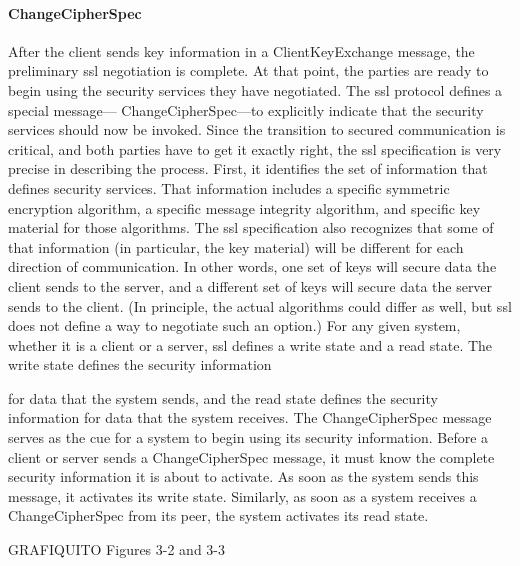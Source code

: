 \paragraph{ChangeCipherSpec}
After the client sends key information in a ClientKeyExchange message, 
the preliminary ssl negotiation is complete. At that point, the
parties are ready to begin using the security services they have negotiated.
 The ssl protocol defines a special message—
ChangeCipherSpec—to explicitly indicate that the security services
should now be invoked.
Since the transition to secured communication is critical, and both
parties have to get it exactly right, the ssl specification is very precise
in describing the process. First, it identifies the set of information
that defines security services. That information includes a specific
symmetric encryption algorithm, a specific message integrity algorithm, 
and specific key material for those algorithms. The ssl specification also 
recognizes that some of that information (in particular,
the key material) will be different for each direction of communication. 
In other words, one set of keys will secure data the client sends
to the server, and a different set of keys will secure data the server
sends to the client. (In principle, the actual algorithms could differ as
well, but ssl does not define a way to negotiate such an option.) For
any given system, whether it is a client or a server, ssl defines a write
state and a read state. The write state defines the security information

for data that the system sends, and the read state defines the security
information for data that the system receives.
The ChangeCipherSpec message serves as the cue for a system to
begin using its security information. Before a client or server sends a
ChangeCipherSpec message, it must know the complete security information it 
is about to activate. As soon as the system sends this
message, it activates its write state. Similarly, as soon as a system receives
 a ChangeCipherSpec from its peer, the system activates its
read state.

GRAFIQUITO Figures 3-2 and 3-3

